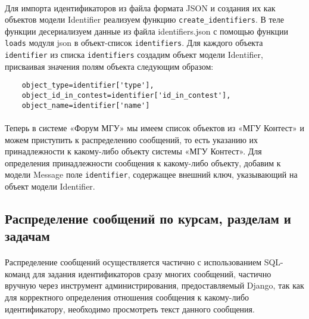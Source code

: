\documentclass[12pt, a4paper, oneside]{article}
\begin{document}
\paragraph{}
Для импорта идентификаторов из файла формата JSON и создания их как объектов модели Identifier реализуем функцию \texttt{create\_identifiers}. В теле функции десериализуем данные из файла identifiers.json с помощью функции \texttt{loads} модуля json в объект-список \texttt{identifiers}. Для каждого объекта \texttt{identifier} из списка \texttt{identifiers} создадим объект модели Identifier, присваивая значения полям объекта следующим образом:
\begin{verbatim}
    object_type=identifier['type'],
    object_id_in_contest=identifier['id_in_contest'],
    object_name=identifier['name']
\end{verbatim}
\paragraph{}
Теперь в системе «Форум МГУ» мы имеем список объектов из «МГУ Контест» и можем приступить к распределению сообщений, то есть указанию их принадлежности к какому-либо объекту системы «МГУ Контест». Для определения принадлежности сообщения к какому-либо объекту, добавим к модели Message поле \texttt{identifier}, содержащее внешний ключ, указывающий на объект модели Identifier.
\vspace{1cm}

\subsection{Распределение сообщений по курсам, разделам и задачам}
\paragraph{}
Распределение сообщений осуществляется частично с использованием SQL-команд для задания идентификаторов сразу многих сообщений, частично вручную через инструмент администрирования, предоставляемый Django, так как для корректного определения отношения сообщения к какому-либо идентификатору, необходимо просмотреть текст данного сообщения.
\end{document}
